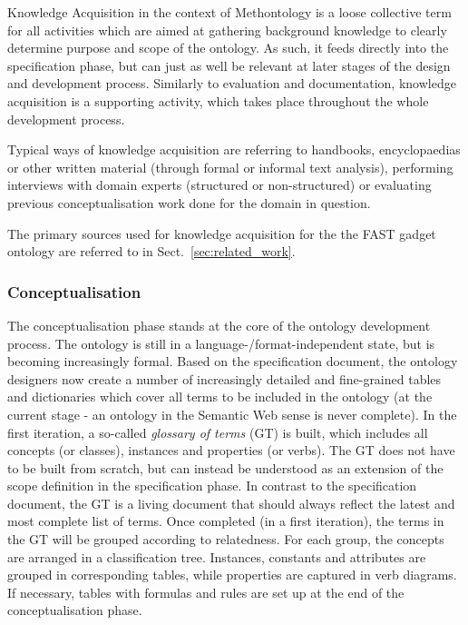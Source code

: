 \documentclass[twoside]{fast_latex}
\begin{document}
Knowledge Acquisition in the context of Methontology is a loose collective term for all activities which are aimed at gathering background knowledge to clearly determine purpose and scope of the ontology. As such, it feeds directly into the specification phase, but can just as well be relevant at later stages of the design and development process. Similarly to evaluation and documentation, knowledge acquisition is a supporting activity, which takes place throughout the whole development process.

Typical ways of knowledge acquisition are referring to handbooks, encyclopaedias or other written material (through formal or informal text analysis), performing interviews with domain experts (structured or non-structured) or evaluating previous conceptualisation work done for the domain in question.

The primary sources used for knowledge acquisition for the the FAST gadget ontology are referred to in Sect.~\ref{sec:related_work}.

\subsubsection{Conceptualisation} %
\label{ssub:conceptualisation}

The conceptualisation phase stands at the core of the ontology development process. The ontology is still in a language-/format-independent state, but is becoming increasingly formal. Based on the specification document, the ontology designers now create a number of increasingly detailed and fine-grained tables and dictionaries which cover all terms to be included in the ontology (at the current stage - an ontology in the Semantic Web sense is never complete). In the first iteration, a so-called \emph{glossary of terms} (GT) is built, which includes all concepts (or classes), instances and properties (or verbs). The GT does not have to be built from scratch, but can instead be understood as an extension of the scope definition in the specification phase.  In contrast to the specification document, the GT is a living document that should always reflect the latest and most complete list of terms. Once completed (in a first iteration), the terms in the GT will be grouped according to relatedness. For each group, the concepts are arranged in a classification tree. Instances, constants and attributes are grouped in corresponding tables, while properties are captured in verb diagrams. If necessary, tables with formulas and rules are set up at the end of the conceptualisation phase.
\end{document}

